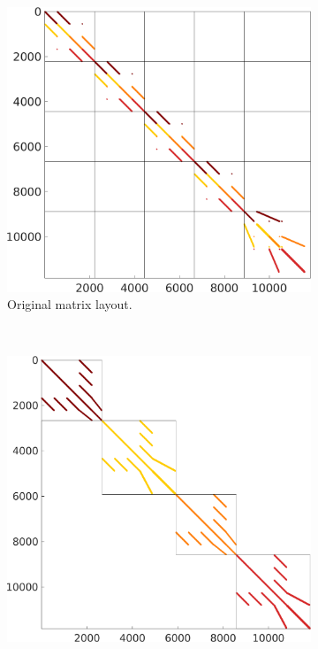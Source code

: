 \begin{figure}%
  \centering%
  \begin{subfigure}[t]{0.49\textwidth}%
    \centering%
    \includegraphics[width=\textwidth]{images/implementation/original_diagonal_matrix.png}
    \caption{Original matrix layout.}%
    \label{fig:original_diagonal_matrix}%
  \end{subfigure}
  \,
  \begin{subfigure}[t]{0.49\textwidth}%
    \centering%
    \includegraphics[width=\textwidth]{images/implementation/reordered_diagonal_matrix.png}

\end{subfigure}
\end{figure}
